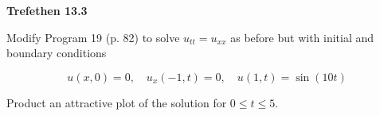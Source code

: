 \textbf{Trefethen 13.3}

Modify Program 19 (p. 82) to solve $u_{tt} = u_{xx}$ as before but with initial and boundary conditions

$$
u(x, 0) = 0, \quad u_x(-1, t) = 0, \quad u(1, t) = \sin{(10t)}
$$

Product an attractive plot of the solution for $0 \le t \le 5$.

\begin{solution}
\end{solution}